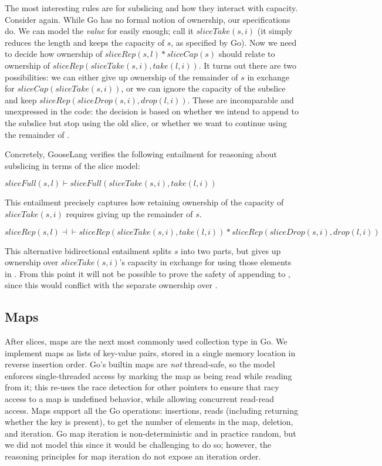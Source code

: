 The most interesting rules are for subslicing and how they interact with
capacity. Consider  again. While Go has no formal
notion of ownership, our specifications do. We can model the
\emph{value} for  easily enough; call it
$sliceTake(s, i)$ (it simply reduces the length and keeps the capacity
of $s$, as specified by Go). Now we need to decide how ownership of
$sliceRep(s, l) * sliceCap(s)$ should relate to ownership of
$sliceRep(sliceTake(s, i), take(l, i))$. It turns out there are two
possibilities: we can either give up ownership of the remainder of $s$
in exchange for $sliceCap(sliceTake(s, i))$, or we can ignore the
capacity of the subslice and keep
$sliceRep(sliceDrop(s, i), drop(l, i))$. These are incomparable and
unexpressed in the code: the decision is based on whether we intend to
append to the subslice but stop using the old slice, or whether we want
to continue using the remainder of .

Concretely, GooseLang verifies the following entailment for reasoning
about subslicing in terms of the slice model:

$sliceFull(s, l) \vdash sliceFull(sliceTake(s, i), take(l, i))$

This entailment precisely captures how retaining ownership of the
capacity of $sliceTake(s, i)$ requires giving up the remainder of
$s$.

$sliceRep(s, l) \dashv\vdash sliceRep(sliceTake(s, i), take(l, i)) * sliceRep(sliceDrop(s, i), drop(l, i))$

This alternative bidirectional entailment splits $s$ into two parts,
but gives up ownership over $sliceTake(s, i)$'s capacity in exchange
for using those elements in . From this point it will
not be possible to prove the safety of appending to ,
since this would conflict with the separate ownership over
.

\subsection{Maps}

After slices, maps are the next most commonly used collection type in
Go. We implement maps as lists of key-value pairs, stored in a single
memory location in reverse insertion order. Go's builtin maps are
\emph{not} thread-safe, so the model enforces single-threaded access by
marking the map as being read while reading from it; this re-uses the
race detection for other pointers to ensure that racy access to a map is
undefined behavior, while allowing concurrent read-read access. Maps
support all the Go operations: insertions, reads (including returning
whether the key is present),  to get the number of elements
in the map, deletion, and iteration. Go map iteration is
non-deterministic and in practice random, but we did not model this
since it would be challenging to do so; however, the reasoning
principles for map iteration do not expose an iteration order.

